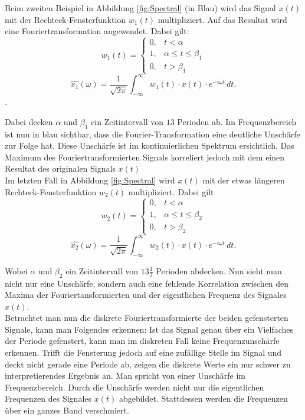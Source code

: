 Beim zweiten Beispiel in Abbildung \ref{fig:Spectral} (in Blau) wird das Signal $x(t)$ mit der Rechteck-Fensterfunktion $w_{1}(t)$ multipliziert. Auf das Resultat wird eine Fouriertransformation angewendet. Dabei gilt: 
\begin{equation}
	w_{1}(t)=  \left\{\begin{array}{lll}{0,} & {t<\alpha}  \\ {1,}&{\alpha\leq t \leq\beta_{1}} \\ {0,} &{t>\beta_{1}}\end{array} \right.
\end{equation}
\begin{equation}
	\hat{x_{1}}(\omega)=\frac{1}{\sqrt{2 \pi}} \int_{-\infty}^{\infty} w_{1}(t)\cdot x(t) \cdot e^{-i \omega t} \,dt.
\end{equation}.

Dabei decken $\alpha$ und $\beta_{1}$ ein Zeitintervall von $13$ Perioden ab. Im Frequenzbereich ist nun in blau sichtbar, dass die Fourier-Transformation eine deutliche Unschärfe zur Folge hat. Diese Unschärfe ist im kontinuierlichen Spektrum ersichtlich. Das Maximum des Fouriertransformierten Signals korreliert jedoch mit dem einen Resultat des originalen Signals $x(t)$\\




Im letzten Fall in Abbildung \ref{fig:Spectral} wird $x(t)$ mit der etwas längeren Rechteck-Fensterfunktion $w_{2}(t)$ multipliziert. Dabei gilt 
\begin{equation}
	w_{2}(t)= \left\{ \begin{array}{lll}{0,}&{t<\alpha}  \\ {1,}&{\alpha\leq t \leq\beta_{2}} \\ {0,}&{t>\beta_{2}}\end{array} \right.
\end{equation}
\begin{equation}
	\hat{x_{2}}(\omega)=\frac{1}{\sqrt{2 \pi}} \int_{-\infty}^{\infty} w_{2}(t)\cdot x(t) \cdot e^{-i \omega t} \,dt.
\end{equation}

Wobei $\alpha$ und $\beta_{2}$ ein Zeitintervall von $13\frac{1}{2}$ Perioden abdecken. Nun sieht man nicht nur eine Unschärfe, sondern auch eine fehlende Korrelation zwischen den Maxima der Fouriertansformierten und der eigentlichen Frequenz des Signales $x(t)$.\\

Betrachtet man nun die diskrete Fouriertransformierte der beiden gefensterten Signale, kann man Folgendes erkennen: Ist das Signal genau über ein Vielfaches der Periode gefenstert, kann man im diskreten Fall keine Frequenzunschärfe erkennen. Trifft die Fensterung jedoch auf eine zufällige Stelle im Signal und deckt nicht gerade eine Periode ab, zeigen die diskrete Werte ein nur schwer zu interpretierendes Ergebnis an. Man spricht von einer Unschärfe im Frequenzbereich. Durch die Unschärfe werden nicht nur die eigentlichen Frequenzen des Signales $x(t)$ abgebildet. Stattdessen werden die Frequenzen über ein ganzes Band verschmiert.\\

